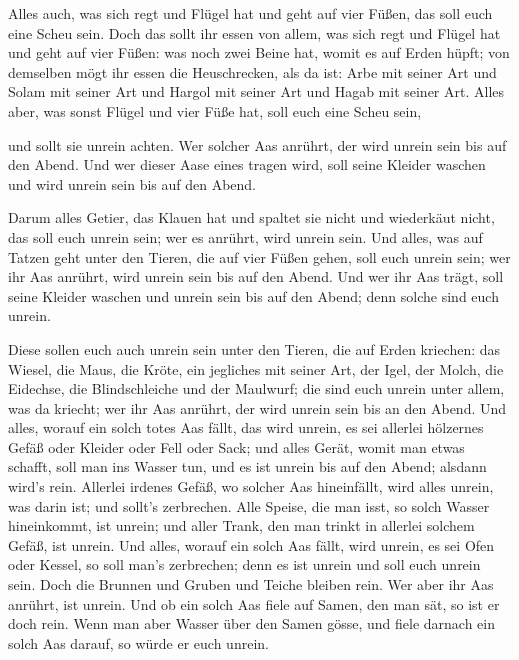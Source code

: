  Alles auch, was sich regt und Flügel hat und geht auf vier
Füßen, das soll euch eine Scheu sein.  Doch das sollt ihr
essen von allem, was sich regt und Flügel hat und geht auf vier Füßen:
was noch zwei Beine hat, womit es auf Erden hüpft;  von
demselben mögt ihr essen die Heuschrecken, als da ist: Arbe mit seiner
Art und Solam mit seiner Art und Hargol mit seiner Art und Hagab mit
seiner Art.  Alles aber, was sonst Flügel und vier Füße
hat, soll euch eine Scheu sein,

 und sollt sie unrein achten. Wer solcher Aas anrührt, der
wird unrein sein bis auf den Abend.  Und wer dieser Aase
eines tragen wird, soll seine Kleider waschen und wird unrein sein bis
auf den Abend.

 Darum alles Getier, das Klauen hat und spaltet sie nicht
und wiederkäut nicht, das soll euch unrein sein; wer es anrührt, wird
unrein sein.  Und alles, was auf Tatzen geht unter den
Tieren, die auf vier Füßen gehen, soll euch unrein sein; wer ihr Aas
anrührt, wird unrein sein bis auf den Abend.  Und wer ihr
Aas trägt, soll seine Kleider waschen und unrein sein bis auf den Abend;
denn solche sind euch unrein.

 Diese sollen euch auch unrein sein unter den Tieren, die
auf Erden kriechen: das Wiesel, die Maus, die Kröte, ein jegliches mit
seiner Art,  der Igel, der Molch, die Eidechse, die
Blindschleiche und der Maulwurf;  die sind euch unrein
unter allem, was da kriecht; wer ihr Aas anrührt, der wird unrein sein
bis an den Abend.  Und alles, worauf ein solch totes Aas
fällt, das wird unrein, es sei allerlei hölzernes Gefäß oder Kleider
oder Fell oder Sack; und alles Gerät, womit man etwas schafft, soll man
ins Wasser tun, und es ist unrein bis auf den Abend; alsdann wird's
rein.  Allerlei irdenes Gefäß, wo solcher Aas hineinfällt,
wird alles unrein, was darin ist; und sollt's zerbrechen. 
Alle Speise, die man isst, so solch Wasser hineinkommt, ist unrein; und
aller Trank, den man trinkt in allerlei solchem Gefäß, ist unrein.
 Und alles, worauf ein solch Aas fällt, wird unrein, es sei
Ofen oder Kessel, so soll man's zerbrechen; denn es ist unrein und soll
euch unrein sein.  Doch die Brunnen und Gruben und Teiche
bleiben rein. Wer aber ihr Aas anrührt, ist unrein.  Und ob
ein solch Aas fiele auf Samen, den man sät, so ist er doch rein.
 Wenn man aber Wasser über den Samen gösse, und fiele
darnach ein solch Aas darauf, so würde er euch unrein.

